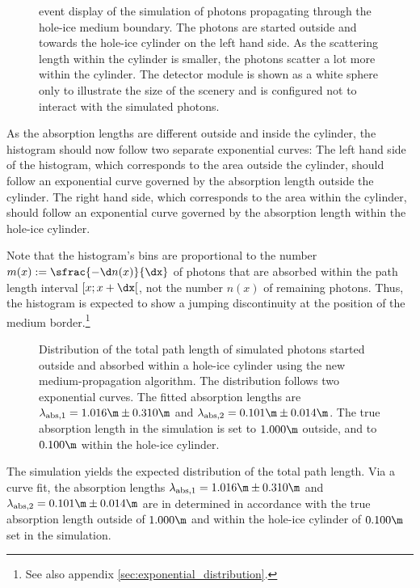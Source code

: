 
\begin{figure}[htb]
  \caption{\steamshovel event display of the simulation of photons propagating through the hole-ice medium boundary. The photons are started outside and towards the hole-ice cylinder on the left hand side. As the scattering length within the cylinder is smaller, the photons scatter a lot more within the cylinder. The detector module is shown as a white sphere only to illustrate the size of the scenery and is configured not to interact with the simulated photons.}
\end{figure}

As the absorption lengths are different outside and inside the cylinder, the histogram should now follow two separate exponential curves: The left hand side of the histogram, which corresponds to the area outside the cylinder, should follow an exponential curve governed by the absorption length outside the cylinder. The right hand side, which corresponds to the area within the cylinder, should follow an exponential curve governed by the absorption length within the hole-ice cylinder.

Note that the histogram's bins are proportional to the number $m(x):=\sfrac{-\d n(x)}{\dx}$ of photons that are absorbed within the path length interval $[x; x+\dx[$, not the number $n(x)$ of remaining photons. Thus, the histogram is expected to show a jumping discontinuity at the position of the medium border.\footnote{See also appendix \ref{sec:exponential_distribution}.}

\begin{figure}
  \caption{Distribution of the total path length of simulated photons started outside and absorbed within a hole-ice cylinder using the new medium-propagation algorithm. The distribution follows two exponential curves. The fitted absorption lengths are $\lambda_\text{abs,1} = 1.016\m \pm 0.310\m$ and $\lambda_\text{abs,2} = 0.101\m \pm 0.014\m$. The true absorption length in the simulation is set to $1.000\m$ outside, and to $0.100\m$ within the hole-ice cylinder.}
\end{figure}

The simulation yields the expected distribution of the total path length. Via a curve fit, the absorption lengths $\lambda_\text{abs,1} = 1.016\m \pm 0.310\m$ and $\lambda_\text{abs,2} = 0.101\m \pm 0.014\m$ are in determined in accordance with the true absorption length outside of $1.000\m$ and within the hole-ice cylinder of $0.100\m$ set in the simulation.

